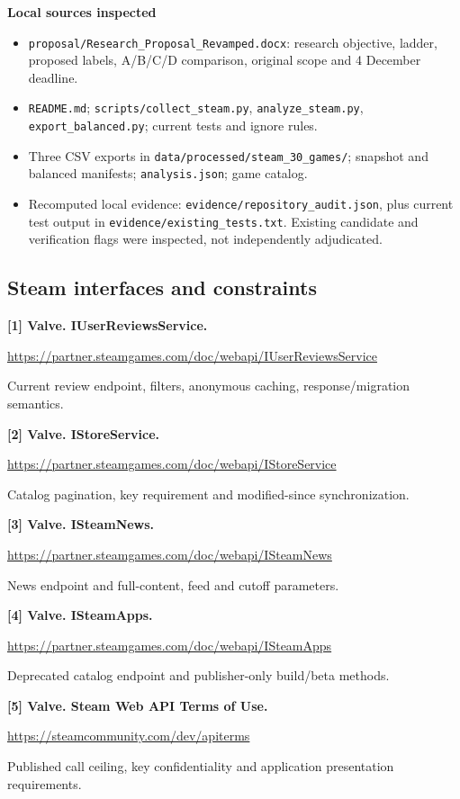 \documentclass[10pt,letterpaper]{article}
\newcommand{\key}[1]{\textbf{\color{ink}#1}}
\begin{document}
\key{Local sources inspected}
\begin{itemize}
\item \texttt{proposal/Research\_Proposal\_Revamped.docx}: research objective, ladder, proposed labels, A/B/C/D comparison, original scope and 4 December deadline.
\item \texttt{README.md}; \texttt{scripts/collect\_steam.py}, \texttt{analyze\_steam.py}, \texttt{export\_balanced.py}; current tests and ignore rules.
\item Three CSV exports in \texttt{data/processed/steam\_30\_games/}; snapshot and balanced manifests; \texttt{analysis.json}; game catalog.
\item Recomputed local evidence: \nolinkurl{evidence/repository_audit.json}, plus current test output in \nolinkurl{evidence/existing_tests.txt}. Existing candidate and verification flags were inspected, not independently adjudicated.
\end{itemize}

\subsection{Steam interfaces and constraints}
\hypertarget{src1}{}\key{[1] Valve. IUserReviewsService.}\par
\url{https://partner.steamgames.com/doc/webapi/IUserReviewsService}\par
Current review endpoint, filters, anonymous caching, response/migration semantics.

\hypertarget{src2}{}\key{[2] Valve. IStoreService.}\par
\url{https://partner.steamgames.com/doc/webapi/IStoreService}\par
Catalog pagination, key requirement and modified-since synchronization.

\hypertarget{src3}{}\key{[3] Valve. ISteamNews.}\par
\url{https://partner.steamgames.com/doc/webapi/ISteamNews}\par
News endpoint and full-content, feed and cutoff parameters.

\hypertarget{src4}{}\key{[4] Valve. ISteamApps.}\par
\url{https://partner.steamgames.com/doc/webapi/ISteamApps}\par
Deprecated catalog endpoint and publisher-only build/beta methods.

\hypertarget{src5}{}\key{[5] Valve. Steam Web API Terms of Use.}\par
\url{https://steamcommunity.com/dev/apiterms}\par
Published call ceiling, key confidentiality and application presentation requirements.
\end{document}
